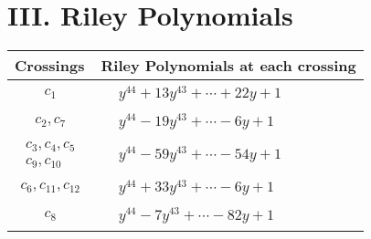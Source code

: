 \documentclass[1p]{elsarticle_modified}
\theoremstyle{definition}
\begin{document}
\centering \section*{ III. Riley Polynomials}
\begin{tabular}{m{50pt}|m{274pt}}
Crossings & \hspace{64pt}Riley Polynomials at each crossing \\
\hline $$\begin{aligned}c_{1}\end{aligned}$$&$\begin{aligned}
&y^{44}+13 y^{43}+\cdots+22 y+1
\end{aligned}$\\
\hline $$\begin{aligned}c_{2},c_{7}\end{aligned}$$&$\begin{aligned}
&y^{44}-19 y^{43}+\cdots-6 y+1
\end{aligned}$\\
\hline $$\begin{aligned}c_{3},c_{4},c_{5}\\c_{9},c_{10}\end{aligned}$$&$\begin{aligned}
&y^{44}-59 y^{43}+\cdots-54 y+1
\end{aligned}$\\
\hline $$\begin{aligned}c_{6},c_{11},c_{12}\end{aligned}$$&$\begin{aligned}
&y^{44}+33 y^{43}+\cdots-6 y+1
\end{aligned}$\\
\hline $$\begin{aligned}c_{8}\end{aligned}$$&$\begin{aligned}
&y^{44}-7 y^{43}+\cdots-82 y+1
\end{aligned}$\\
\hline
\end{tabular}
\vskip 2pc
\end{document}
